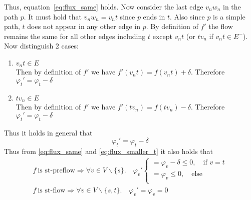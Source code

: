 \documentclass[10pt,a4paper]{article}
\begin{document}
	Thus, equation~\ref{eq:flux_same} holds. Now consider the last edge $v_nw_n$ in the path $p$. It must hold that $v_nw_n = v_nt$ since $p$ ends in $t$. Also since $p$ is a simple path, $t$ does not appear in any other edge in $p$. By definition of $f'$ the flow remains the same for all other edges including $t$ except $v_nt$ (or $tv_n$ if $v_nt \in E^-$). Now distinguish 2 cases:
	\begin{enumerate}
		\item $v_nt \in E$ \\
		Then by definition of $f'$ we have $f'(v_nt) = f(v_nt) + \delta$. Therefore $\varphi_t' = \varphi_t - \delta$
		
		\item $tv_n \in E$ \\
		Then by definition of $f'$ we have $f'(tv_n) = f(tv_n) - \delta$. Therefore $\varphi_t' = \varphi_t - \delta$
	\end{enumerate}
	Thus it holds in general that 
	\begin{equation}
	\label{eq:flux_smaller_t}
	\varphi_t' = \varphi_t - \delta
	\end{equation}
	Thus from \ref{eq:flux_same} and \ref{eq:flux_smaller_t} it also holds that
		\begin{align}
		\label{eq:flux_cond_satis}
		f~\text{is st-preflow} \Rightarrow \forall v \in V \backslash \{s\}. \quad \varphi_v' 
		\begin{cases}
		= \varphi_v - \delta \leq 0, \quad \text{if } v=t\\
		= \varphi_v \leq 0,  \quad \text{else} \\
		\end{cases} \\
		f~\text{is st-flow} \Rightarrow \forall v \in V \backslash \{s,t\}. \quad  
		\varphi_v' = \varphi_v = 0 
		\end{align}
		
\end{document}
